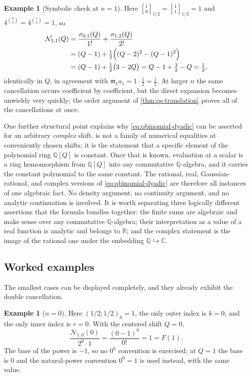 \documentclass[11pt,oneside]{article}
\theoremstyle{definition}
\newtheorem{example}[theorem]{Example}
\theoremstyle{remark}
\newcommand{\R}{\mathbb R}
\newcommand{\C}{\mathbb C}
\newcommand{\Q}{\mathbb Q}
\newcommand{\qbinom}[3]{\genfrac{[}{]}{0pt}{}{#1}{#2}_{#3}}
\begin{document}
\begin{example}[Symbolic check at $n=1$]
\label{ex:qs-n1-symbolic}
Here $\qbinom10{1/2}=\qbinom11{1/2}=1$ and $4^{\binom02}=4^{\binom12}=1$, so
\begin{align*}
 \mathcal N_{1,1}(Q)
 &=\frac{\sigma_{0,1}(Q)}{1!}+\frac{\sigma_{1,2}(Q)}{2!}\\
 &=(Q-1)+\tfrac12\Bigl((Q-2)^2-(Q-1)^2\Bigr)\\
 &=(Q-1)+\tfrac12\bigl(3-2Q\bigr)
 =Q-1+\tfrac32-Q=\tfrac12,
\end{align*}
identically in $Q$, in agreement with $\mathfrak m_1a_1=1\cdot\tfrac12=\tfrac12$.  At larger
$n$ the same cancellation occurs coefficient by coefficient, but the direct expansion becomes
unwieldy very quickly; the order argument of \cref{thm:qs-translation} proves all of the
cancellations at once.
\end{example}

One further structural point explains why \eqref{eq:qbinomial-dyadic} can be asserted for an
arbitrary \emph{complex} shift.   is not a family of numerical
equalities at conveniently chosen shifts; it is the statement that a specific element of the
polynomial ring $\Q[Q]$ is constant.  Once that is known, evaluation at a scalar is a ring
homomorphism from $\Q[Q]$ into any commutative $\Q$-algebra, and it carries the constant
polynomial to the same constant.  The rational, real, Gaussian-rational, and complex versions
of \eqref{eq:qbinomial-dyadic} are therefore all instances of one algebraic fact.  No density
argument, no continuity argument, and no analytic continuation is involved.  It is worth
separating three logically different assertions that the formula bundles together: the finite
sums are algebraic and make sense over any commutative $\Q$-algebra; their interpretation as
a value of a real function is analytic and belongs to $\R$; and the complex statement is the
image of the rational one under the embedding $\Q\hookrightarrow\C$.

\subsection{Worked examples}
\label{subsec:qs-examples}

The smallest cases can be displayed completely, and they already exhibit the double
cancellation.

\begin{example}[$n=0$]
\label{ex:qs-n0}
Here $(1/2;1/2)_0=1$, the only outer index is $k=0$, and the only inner index is $r=0$.  With
the centered shift $Q=0$,
\begin{equation*}
 \frac{\mathcal N_{1,0}(0)}{2^0\cdot1}=\frac{(0-1)^0}{0!}=1=F(1).
\end{equation*}
The base of the power is $-1$, so no $0^0$ convention is exercised; at $Q=1$ the base is $0$
and the natural-power convention $0^0=1$ is used instead, with the same value.
\end{example}
\end{document}

